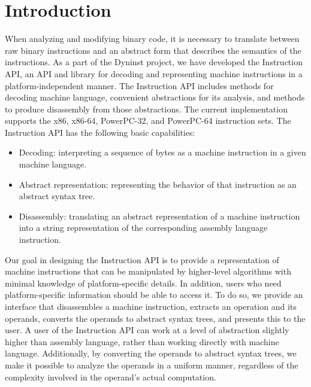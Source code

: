\section{Introduction}
\label{sec:intro}

When analyzing and modifying binary code, it is necessary to translate between
raw binary instructions and an abstract form that describes the semantics of the
instructions. As a part of the Dyninst project, we have developed the
Instruction API, an API and library for decoding and representing machine
instructions in a platform-\/independent manner. The Instruction API includes
methods for decoding machine language, convenient abstractions for its analysis,
and methods to produce disassembly from those abstractions. The current
implementation supports the x86, x86-64, PowerPC-32, and PowerPC-64 instruction sets.
The Instruction API has the following basic capabilities:

\begin{itemize}
\item Decoding: interpreting a sequence of bytes as a machine instruction in a given machine language.
\item Abstract representation: representing the behavior of that instruction as an abstract syntax tree.
\item Disassembly: translating an abstract representation of a machine instruction into a string representation of the corresponding assembly language instruction.
\end{itemize}

Our goal in designing the Instruction API is to provide a representation of
machine instructions that can be manipulated by higher-\/level algorithms with
minimal knowledge of platform-\/specific details. In addition, users who need
platform-\/specific information should be able to access it. To do so, we
provide an interface that disassembles a machine instruction, extracts an
operation and its operands, converts the operands to abstract syntax trees, and
presents this to the user. A user of the Instruction API can work at a level of
abstraction slightly higher than assembly language, rather than working directly
with machine language. Additionally, by converting the operands to abstract
syntax trees, we make it possible to analyze the operands in a uniform manner,
regardless of the complexity involved in the operand's actual computation.  
